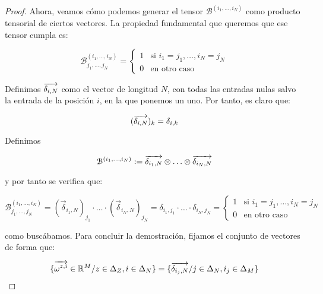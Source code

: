 \begin{proof}
    Ahora, veamos cómo podemos generar el tensor $\mathcal{B}^{(i_1, \ldots, i_N)}$ como producto tensorial de ciertos vectores. La propiedad fundamental que queremos que ese tensor cumpla es:

    \begin{equation}
        \mathcal{B}^{(i_1, \ldots, i_N)}_{j_1, \ldots, j_N} =
        \begin{cases}
            1 & \text{si } i_1 = j_1, \ldots, i_N = j_N \\
            0 & \text{en otro caso}
        \end{cases}
    \end{equation}

    Definimos $\overrightarrow{\delta_{i, N}}$ como el vector de longitud $N$, con todas las entradas nulas salvo la entrada de la posición $i$, en la que ponemos un uno. Por tanto, es claro que:

    \begin{equation}
        (\overrightarrow{\delta_{i, N}})_k =  \delta_{i, k}
    \end{equation}

    Definimos

    \begin{equation}
        \mathcal{B}^{(i_1, \ldots, i_N)} := \overrightarrow{\delta_{i_1, N}} \otimes \ldots \otimes \overrightarrow{\delta_{i_N, N}}
    \end{equation}

    y por tanto se verifica que:

    \begin{equation}
        \mathcal{B}^{(i_1, \ldots, i_N)}_{j_1, \ldots, j_N} = (\vec{\delta}_{i_1, N})_{j_1} \cdot \ldots \cdot (\vec{\delta}_{i_N, N})_{j_N} = \delta_{i_1, j_1} \cdot \ldots \cdot \delta_{i_N, j_N} =
        \begin{cases}
            1 & \text{si } i_1 = j_1, \ldots, i_N = j_N \\
            0 & \text{en otro caso}
        \end{cases}
    \end{equation}

    como buscábamos. Para concluir la demostración, fijamos el conjunto de vectores de forma que:

    \begin{equation} \label{eq:cp_decomp_asignacion_vectores}
        \{\overrightarrow{\omega^{z, i}} \in \mathbb{R}^M / z \in \Delta_{Z}, i \in \Delta_{N} \} =
        \{ \overrightarrow{\delta_{i_j, N}} / j \in \Delta_{N}, i_j \in \Delta_{M} \}
    \end{equation}

\end{proof}

